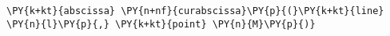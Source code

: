 \begin{Verbatim}[commandchars=\\\{\}]
      \PY{k+kt}{abscissa} \PY{n+nf}{curabscissa}\PY{p}{(}\PY{k+kt}{line} \PY{n}{l}\PY{p}{,} \PY{k+kt}{point} \PY{n}{M}\PY{p}{)}
\end{Verbatim}
